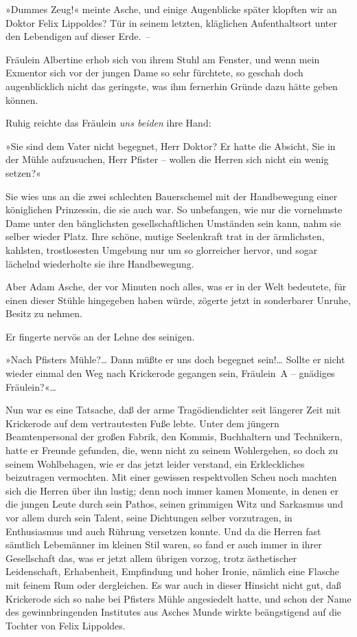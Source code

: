 »Dummes Zeug!« meinte Asche, und einige Augenblicke später klopften
wir an Doktor Felix Lippoldes? Tür in seinem letzten, kläglichen
Aufenthaltsort unter den Lebendigen auf dieser Erde.~–

Fräulein Albertine erhob sich von ihrem Stuhl am Fenster, und wenn
mein Exmentor sich vor der jungen Dame so sehr fürchtete, so
geschah doch augenblicklich nicht das geringste, was ihm fernerhin
Gründe dazu hätte geben können.

Ruhig reichte das Fräulein \emph{uns beiden} ihre Hand:

»Sie sind dem Vater nicht begegnet, Herr Doktor? Er hatte die
Absicht, Sie in der Mühle aufzusuchen, Herr Pfister – wollen die
Herren sich nicht ein wenig setzen?«

Sie wies uns an die zwei schlechten Bauerschemel mit der
Handbewegung einer königlichen Prinzessin, die sie auch war. So
unbefangen, wie nur die vornehmste Dame unter den bänglichsten
gesellschaftlichen Umständen sein kann, nahm sie selber wieder
Platz. Ihre schöne, mutige Seelenkraft trat in der ärmlichsten,
kahlsten, trostlosesten Umgebung nur um so glorreicher hervor, und
sogar lächelnd wiederholte sie ihre Handbewegung.

Aber Adam Asche, der vor Minuten noch alles, was er in der Welt
bedeutete, für einen dieser Stühle hingegeben haben würde, zögerte
jetzt in sonderbarer Unruhe, Besitz zu nehmen.

Er fingerte nervös an der Lehne des seinigen.

»Nach Pfisters Mühle?\ldots{} Dann müßte er uns doch begegnet sein!\ldots{}
Sollte er nicht wieder einmal den Weg nach Krickerode gegangen
sein, Fräulein~A – gnädiges Fräulein?«\ldots{}

Nun war es eine Tatsache, daß der arme Tragödiendichter seit
längerer Zeit mit Krickerode auf dem vertrautesten Fuße lebte.
Unter dem jüngern Beamtenpersonal der großen Fabrik, den Kommis,
Buchhaltern und Technikern, hatte er Freunde gefunden, die, wenn
nicht zu seinem Wohlergehen, so doch zu seinem Wohlbehagen, wie er
das jetzt leider verstand, ein Erkleckliches beizutragen
vermochten. Mit einer gewissen respektvollen Scheu noch machten
sich die Herren über ihn lustig; denn noch immer kamen Momente, in
denen er die jungen Leute durch sein Pathos, seinen grimmigen Witz
und Sarkasmus und vor allem durch sein Talent, seine Dichtungen
selber vorzutragen, in Enthusiasmus und auch Rührung versetzen
konnte. Und da die Herren fast sämtlich Lebemänner im kleinen Stil
waren, so fand er auch immer in ihrer Gesellschaft das, was er
jetzt allem übrigen vorzog, trotz ästhetischer Leidenschaft,
Erhabenheit, Empfindung und hoher Ironie, nämlich eine Flasche mit
feinem Rum oder dergleichen. Es war auch in dieser Hinsicht nicht
gut, daß Krickerode sich so nahe bei Pfisters Mühle angesiedelt
hatte, und schon der Name des gewinnbringenden Institutes aus
Asches Munde wirkte beängstigend auf die Tochter von Felix
Lippoldes.

